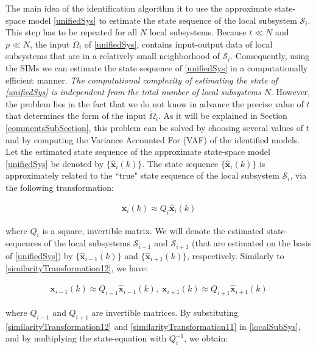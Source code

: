 \documentclass[journal,10pt]{IEEEtran}
\begin{document}
The main idea of the identification algorithm it to use the approximate state-space model \eqref{unifiedSys} to estimate the state sequence of the local subsystem $\mathcal{S}_{i}$. This step has to be repeated for all $N$ local subsystems. Because $t\ll N$ and $p\ll N$, the input $\breve{\Omega}_{i}$ of \eqref{unifiedSys}, contains input-output data of local subsystems that are in a relatively small neighborhood of $\mathcal{S}_{i}$. Consequently, using the SIMs \cite{verhaegen2007} we can estimate the state sequence of \eqref{unifiedSys} in a computationally efficient manner. \textit{The computational complexity of estimating the state of \eqref{unifiedSys} is independent from the total number of local subsystems $N$}. However, the problem lies in the fact that we do not know in advance the precise value of $t$ that determines the form of the input $\breve{\Omega}_{i}$. As it will be explained in Section \ref{commentsSubSection}, this problem can be solved by choosing several values of $t$ and by computing the Variance Accounted For (VAF) of the identified models.
\\
Let the estimated state sequence of the approximate state-space model \eqref{unifiedSys} be denoted by $\{\hat{\mathbf{x}}_{i}(k)\}$. The state sequence $\{\hat{\mathbf{x}}_{i}(k)\}$ is approximately related to the ``true" state sequence of the local subsystem $\mathcal{S}_{i}$, via the following transformation:
\begin{small}
\begin{align}
 \mathbf{x}_{i}(k) \approx Q_{i}\hat{\mathbf{x}}_{i}(k)
\label{similarityTransformation12}
\end{align}
\end{small}
where $Q_{i}$ is a square, invertible matrix. We will denote the estimated state-sequences of the local subsystems $\mathcal{S}_{i-1}$ and $\mathcal{S}_{i+1}$ (that are estimated on the basis of \eqref{unifiedSys}) by $\{\hat{\mathbf{x}}_{i-1}(k)\}$ and $\{\hat{\mathbf{x}}_{i+1}(k)\}$, respectively. Similarly to \eqref{similarityTransformation12}, we have:
\begin{small}
\begin{align}
 \mathbf{x}_{i-1}(k)\approx Q_{i-1}\hat{\mathbf{x}}_{i-1}(k),\; \mathbf{x}_{i+1}(k) \approx Q_{i+1}\hat{\mathbf{x}}_{i+1}(k)
\label{similarityTransformation11}
\end{align}
\end{small}
where $Q_{i-1}$ and $Q_{i+1}$ are invertible matrices. By substituting \eqref{similarityTransformation12} and \eqref{similarityTransformation11} in \eqref{localSubSys}, and by multiplying the state-equation with $Q_{i}^{-1}$, we obtain:
\end{document}
